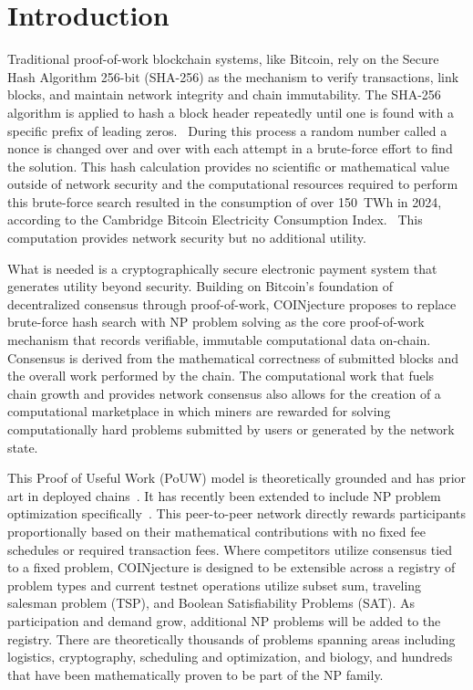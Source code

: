 \documentclass[12pt,letterpaper]{article}
\begin{document}
\section*{Introduction}

Traditional proof-of-work blockchain systems, like Bitcoin, rely on the Secure Hash Algorithm 256-bit
(SHA-256) as the mechanism to verify transactions, link blocks, and maintain network integrity and chain
immutability. The SHA-256 algorithm is applied to hash a block header repeatedly until one is found with
a specific prefix of leading zeros.~\cite{nakamoto} During this process a random number called a nonce
is changed over and over with each attempt in a brute-force effort to find the solution. This hash
calculation provides no scientific or mathematical value outside of network security and the computational
resources required to perform this brute-force search resulted in the consumption of over 150~TWh in
2024, according to the Cambridge Bitcoin Electricity Consumption Index.~\cite{cbeci} This computation
provides network security but no additional utility.

What is needed is a cryptographically secure electronic payment system that generates utility beyond
security. Building on Bitcoin's foundation of decentralized consensus through proof-of-work,
COINjecture proposes to replace brute-force hash search with NP problem solving as the core
proof-of-work mechanism that records verifiable, immutable computational data on-chain. Consensus is
derived from the mathematical correctness of submitted blocks and the overall work performed by the
chain. The computational work that fuels chain growth and provides network consensus also allows for
the creation of a computational marketplace in which miners are rewarded for solving computationally
hard problems submitted by users or generated by the network state.

This Proof of Useful Work (PoUW) model is theoretically grounded and has prior art in deployed
chains~\cite{ball2017,primecoin}. It has recently been extended to include NP problem optimization
specifically~\cite{oliver2017}. This peer-to-peer network directly rewards participants proportionally
based on their mathematical contributions with no fixed fee schedules or required transaction fees. Where
competitors utilize consensus tied to a fixed problem, COINjecture is designed to be extensible across a
registry of problem types and current testnet operations utilize subset sum, traveling salesman
problem (TSP), and Boolean Satisfiability Problems (SAT). As participation and demand grow,
additional NP problems will be added to the registry. There are theoretically thousands of problems
spanning areas including logistics, cryptography, scheduling and optimization, and biology, and
hundreds that have been mathematically proven to be part of the NP family.
\end{document}

